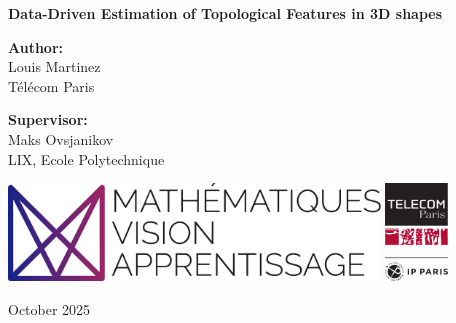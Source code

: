 \documentclass[11pt,a4paper]{article}
\newcommand{\ThesisTitle}{Data-Driven Estimation of Topological Features in 3D shapes}
\newcommand{\AuthorName}{Louis Martinez}
\newcommand{\AuthorAffiliation}{Télécom Paris}
\newcommand{\SupervisorName}{Maks Ovsjanikov}
\newcommand{\SupervisorAffiliation}{LIX, Ecole Polytechnique}
\newcommand{\MonthYear}{October 2025}
\begin{document}
\begin{titlepage}
    \centering
    \vspace*{2cm}

    {\LARGE\bfseries \ThesisTitle\par}
    \vspace{1.6cm}

    {\large \textbf{Author:} \\ \AuthorName \\[0.2cm]
    \AuthorAffiliation\par}

    \vspace{1.0cm}

    {\large \textbf{Supervisor:} \\ \SupervisorName \\[0.2cm]
    \SupervisorAffiliation\par}

    \vfill
    \begin{center}
        \includegraphics[height=2.6cm]{logos/logo_mva.pdf}\hspace{1.2cm}%
        \includegraphics[height=2.6cm]{logos/logo_tp.pdf}
    \end{center}
    \vfill

    {\large \MonthYear\par}
\end{titlepage}

\setcounter{page}{1}
\tableofcontents
\clearpage


\clearpage






\appendix


\printbibliography
\end{document}

